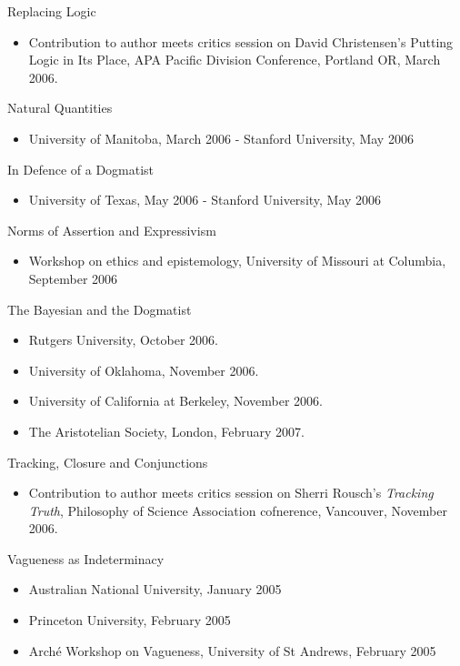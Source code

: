 \documentclass[
  10pt,
  letterpaper,
  DIV=11,
  numbers=noendperiod,
  twoside]{scrartcl}
\providecommand{\tightlist}{%
  \setlength{\itemsep}{0pt}\setlength{\parskip}{0pt}}\usepackage{longtable,booktabs,array}
\begin{document}
Replacing Logic

\begin{itemize}
\tightlist
\item
  Contribution to author meets critics session on David Christensen's
  Putting Logic in Its Place, APA Pacific Division Conference, Portland
  OR, March 2006.
\end{itemize}

Natural Quantities

\begin{itemize}
\tightlist
\item
  University of Manitoba, March 2006 - Stanford University, May 2006
\end{itemize}

In Defence of a Dogmatist

\begin{itemize}
\tightlist
\item
  University of Texas, May 2006 - Stanford University, May 2006
\end{itemize}

Norms of Assertion and Expressivism

\begin{itemize}
\tightlist
\item
  Workshop on ethics and epistemology, University of Missouri at
  Columbia, September 2006
\end{itemize}

The Bayesian and the Dogmatist

\begin{itemize}
\tightlist
\item
  Rutgers University, October 2006.
\item
  University of Oklahoma, November 2006.
\item
  University of California at Berkeley, November 2006.
\item
  The Aristotelian Society, London, February 2007.
\end{itemize}

Tracking, Closure and Conjunctions

\begin{itemize}
\tightlist
\item
  Contribution to author meets critics session on Sherri Rousch's
  \emph{Tracking Truth}, Philosophy of Science Association cofnerence,
  Vancouver, November 2006.
\end{itemize}

Vagueness as Indeterminacy

\begin{itemize}
\tightlist
\item
  Australian National University, January 2005
\item
  Princeton University, February 2005
\item
  Arché Workshop on Vagueness, University of St Andrews, February 2005
\end{itemize}
\end{document}
